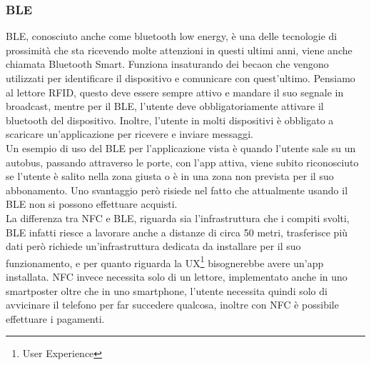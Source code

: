 \subsubsection{BLE}
\hspace{\parindent}BLE, conosciuto anche come bluetooth low energy, è una delle tecnologie di prossimità che sta ricevendo molte attenzioni in questi ultimi anni, viene anche chiamata Bluetooth Smart. Funziona insaturando dei becaon che vengono utilizzati per identificare il dispositivo e comunicare con quest'ultimo. Pensiamo al lettore RFID, questo deve essere sempre attivo e mandare il suo segnale in broadcast, mentre per il BLE, l'utente deve obbligatoriamente attivare il bluetooth del dispositivo. Inoltre, l'utente in molti dispositivi è obbligato a scaricare un'applicazione per ricevere e inviare messaggi.
\\Un esempio di uso del BLE per l'applicazione vista è quando l'utente sale su un autobus, passando attraverso le porte, con l'app attiva, viene subito riconosciuto se l'utente è salito nella zona giusta o è in una zona non prevista per il suo abbonamento. Uno svantaggio però risiede nel fatto che attualmente usando il BLE non si possono effettuare acquisti.
\\La differenza tra NFC e BLE, riguarda sia l'infrastruttura che i compiti svolti, BLE infatti riesce a lavorare anche a distanze di circa 50 metri, trasferisce più dati però richiede un'infrastruttura dedicata da installare per il suo funzionamento, e per quanto riguarda la UX\footnote{User Experience} bisognerebbe avere un'app installata. NFC invece necessita solo di un lettore, implementato anche in uno smartposter oltre che in uno smartphone, l'utente necessita quindi solo di avvicinare il telefono per far succedere qualcosa, inoltre con NFC è possibile effettuare i pagamenti.
